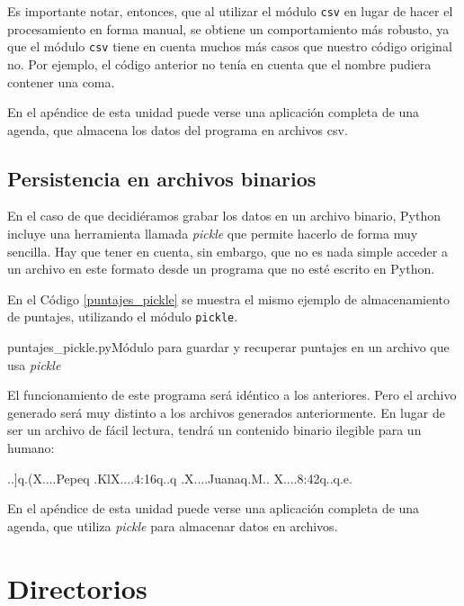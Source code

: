 \begin{observacion}
Es importante notar, entonces, que al utilizar el módulo \lstinline!csv!
en lugar de hacer el procesamiento en forma manual, se obtiene un
comportamiento más robusto, ya que el módulo \lstinline!csv! tiene en
cuenta muchos más casos que nuestro código original no. Por ejemplo, el
código anterior no tenía en cuenta que el nombre pudiera contener una coma.
\end{observacion}

En el apéndice de esta unidad puede verse una aplicación completa de una
agenda, que almacena los datos del programa en archivos csv.

\subsection{Persistencia en archivos binarios}

En el caso de que decidiéramos grabar los datos en un archivo binario,
Python incluye una herramienta llamada \textit{pickle} que permite hacerlo
de forma muy sencilla.  Hay que tener en cuenta, sin embargo, que no es
nada simple acceder a un archivo en este formato desde un programa que no
esté escrito en Python.

En el Código \ref{puntajes_pickle} se muestra el mismo ejemplo de
almacenamiento de puntajes, utilizando el módulo \lstinline!pickle!.

\begin{codigo}{puntajes\_pickle.py}{Módulo para guardar y recuperar puntajes en
    un archivo que usa {\it pickle}}
\label{puntajes_pickle}

\end{codigo}

El funcionamiento de este programa será idéntico a los anteriores.  Pero el
archivo generado será muy distinto a los archivos generados anteriormente.
En lugar de ser un archivo de fácil lectura, tendrá un contenido binario
ilegible para un humano:

\begin{codigo-nohl-sn}
..]q.(X....Pepeq
.KlX....4:16q..q
.X....Juanaq.M..
X....8:42q..q.e.
\end{codigo-nohl-sn}

En el apéndice de esta unidad puede verse una aplicación completa de una
agenda, que utiliza {\it pickle} para almacenar datos en archivos.

\section{Directorios}

